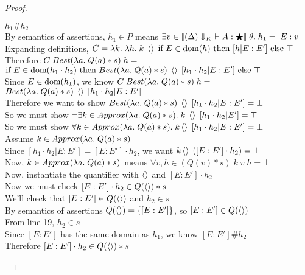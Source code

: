 \begin{proof}
\begin{tabbedproof}
            $h_1 \# h_2$ \\
    \oooooo By semantics of assertions, $h_1 \in P$ means 
            $\exists v \in \interp{\judgeWK[\restrictkind{\Delta}]{A}{\bigstar}}\;\theta.\;
               h_1 = [E:v]$ \\
    \oooooo Expanding definitions, 
             $C = \semfun{k}{\semfun{h}{k\;\unit\;\mbox{if } E\in\domain{h} \mbox{ then } [h|E:E'] \mbox{ else }\top}}$ \\
    \oooooo Therefore $C\;Best(\semfun{a}{Q(a) * s})\;h = $ \\
    \oooooox $\mbox{if }E\in\domain{h_1 \cdot h_2} \mbox{ then }Best(\semfun{a}{Q(a) * s})\;\unit\;[h_1 \cdot h_2|E:E'] \mbox{ else } \top$ \\
    \oooooo Since $E \in \domain{h_1}$, we know $C\;Best(\semfun{a}{Q(a) * s})\;h = $ \\
    \oooooox $Best(\semfun{a}{Q(a) * s})\;\unit\;[h_1 \cdot h_2|E:E']$ \\
    \oooooo Therefore we want to show $Best(\semfun{a}{Q(a) * s})\;\unit\;[h_1 \cdot h_2|E:E'] = \bot$ \\
    \oooooo So we must show $\lnot \exists k \in Approx(\semfun{a}{Q(a) * s}).\; k\;\unit\;[h_1 \cdot h_2|E'] = \top$ \\
    \oooooo So we must show $\forall k \in Approx(\semfun{a}{Q(a) * s}).\; k\unit\;[h_1\cdot h_2|E:E'] = \bot$ \\
    \oooooo Assume $k \in Approx(\semfun{a}{Q(a) * s})$ \\
    \ooooooo Since $[h_1\cdot h_2|E:E'] = [E:E']\cdot h_2$, we want 
             $k\unit\;([E:E']\cdot h_2) = \bot$ \\
    \ooooooo Now, $k \in Approx(\semfun{a}{Q(a) * s})$ means $\forall v, h \in (Q(v) * s)\; k\;v\;h = \bot$ \\
    \ooooooo Now, instantiate the quantifier with $\unit$ and $[E:E']\cdot h_2$ \\
    \ooooooo Now we must check $[E:E']\cdot h_2 \in Q(\unit) * s$ \\
    \ooooooo We'll check that $[E:E'] \in Q(\unit)$ and $h_2 \in s$ \\
    \ooooooo By semantics of assertions $Q(\unit) = \setof{[E:E']}$, so $[E:E'] \in Q(\unit)$ \\
    \ooooooo From line 19, $h_2 \in s$ \\
    \ooooooo Since $[E:E']$ has the same domain as $h_1$, we know $[E:E'] \# h_2$ \\
    \ooooooo Therefore $[E:E']\cdot h_2 \in Q(\unit) * s$ \\

\end{tabbedproof}
\end{proof}
